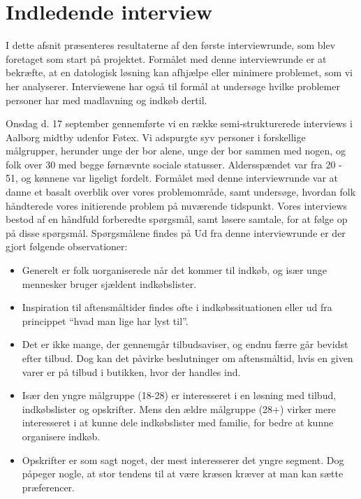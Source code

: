 \section{Indledende interview}\label{section:interview1}
I dette afsnit præsenteres resultaterne af den første interviewrunde, som blev foretaget som start på projektet.
Formålet med denne interviewrunde er at bekræfte, at en datologisk løsning kan afhjælpe eller minimere problemet, som vi her analyserer.
Interviewene har også til formål at undersøge hvilke problemer personer har med madlavning og indkøb dertil.

Onsdag d. 17 september gennemførte vi en række semi-strukturerede interviews i Aalborg midtby udenfor Føtex.
Vi adspurgte syv personer i forskellige målgrupper, herunder unge der bor alene, unge der bor sammen med nogen, og folk over 30 med begge førnævnte sociale statusser.
Aldersspændet var fra 20 - 51, og kønnene var ligeligt fordelt.
Formålet med denne interviewrunde var at danne et basalt overblik over vores problemområde, samt undersøge, hvordan folk håndterede vores initierende problem på nuværende tidspunkt.
Vores interviews bestod af en håndfuld forberedte spørgsmål, samt løsere samtale, for at følge op på disse spørgsmål.
Spørgsmålene findes på 
Ud fra denne interviewrunde er der gjort følgende observationer:
\begin{itemize}
	\item Generelt er folk uorganiserede når det kommer til indkøb, og især unge mennesker bruger sjældent indkøbslister.
	\item Inspiration til aftensmåltider findes ofte i indkøbssituationen eller ud fra princippet “hvad man lige har lyst til”.
	\item Det er ikke mange, der gennemgår tilbudsaviser, og endnu færre går bevidst efter tilbud.
	Dog kan det påvirke beslutninger om aftensmåltid, hvis en given varer er på tilbud i butikken, hvor der handles ind.
	\item Især den yngre målgruppe (18-28) er interesseret i en løsning med tilbud, indkøbslister og opskrifter. Mens den ældre målgruppe (28+) virker mere interesseret i at kunne dele indkøbslister med familie, for bedre at kunne organisere indkøb.
	\item Opskrifter er som sagt noget, der mest interesserer det yngre segment.
	Dog påpeger nogle, at stor tendens til at være kræsen kræver at man kan sætte præferencer.
\end{itemize}

